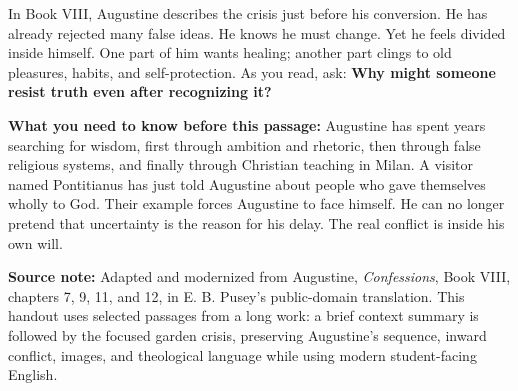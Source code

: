 \documentclass[12pt]{article}
\newcommand{\focusbox}[1]{%
\vspace{0.4em}\noindent\colorbox{gray!12}{\begin{minipage}{0.96\linewidth}#1\end{minipage}}\vspace{0.5em}}
\begin{document}
In Book VIII, Augustine describes the crisis just before his conversion. He has already rejected many false ideas. He knows he must change. Yet he feels divided inside himself. One part of him wants healing; another part clings to old pleasures, habits, and self-protection. As you read, ask: \textbf{Why might someone resist truth even after recognizing it?}

\focusbox{\textbf{What you need to know before this passage:} Augustine has spent years searching for wisdom, first through ambition and rhetoric, then through false religious systems, and finally through Christian teaching in Milan. A visitor named Pontitianus has just told Augustine about people who gave themselves wholly to God. Their example forces Augustine to face himself. He can no longer pretend that uncertainty is the reason for his delay. The real conflict is inside his own will.}

\focusbox{\textbf{Source note:} Adapted and modernized from Augustine, \textit{Confessions}, Book VIII, chapters 7, 9, 11, and 12, in E. B. Pusey's public-domain translation. This handout uses selected passages from a long work: a brief context summary is followed by the focused garden crisis, preserving Augustine's sequence, inward conflict, images, and theological language while using modern student-facing English.}
\end{document}
